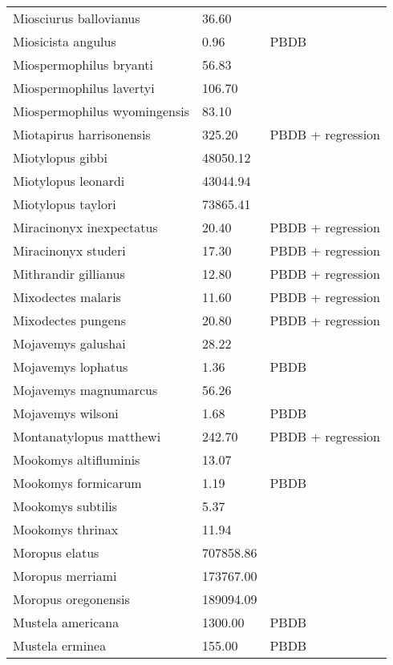 \begin{longtable}{p{} p{} p{}}
    Miosciurus ballovianus & 36.60 & \cite{Tomiya2013} \\ 
    Miosicista angulus & 0.96 & PBDB \\ 
    Miospermophilus bryanti & 56.83 & \cite{Tomiya2013} \\ 
    Miospermophilus lavertyi & 106.70 & \cite{Tomiya2013} \\ 
    Miospermophilus wyomingensis & 83.10 & \cite{Tomiya2013} \\ 
    Miotapirus harrisonensis & 325.20 & PBDB + regression \\ 
    Miotylopus gibbi & 48050.12 & \cite{Tomiya2013} \\ 
    Miotylopus leonardi & 43044.94 & \cite{Tomiya2013} \\ 
    Miotylopus taylori & 73865.41 & \cite{Tomiya2013} \\ 
    Miracinonyx inexpectatus & 20.40 & PBDB + regression \\ 
    Miracinonyx studeri & 17.30 & PBDB + regression \\ 
    Mithrandir gillianus & 12.80 & PBDB + regression \\ 
    Mixodectes malaris & 11.60 & PBDB + regression \\ 
    Mixodectes pungens & 20.80 & PBDB + regression \\ 
    Mojavemys galushai & 28.22 & \cite{Tomiya2013} \\ 
    Mojavemys lophatus & 1.36 & PBDB \\ 
    Mojavemys magnumarcus & 56.26 & \cite{Tomiya2013} \\ 
    Mojavemys wilsoni & 1.68 & PBDB \\ 
    Montanatylopus matthewi & 242.70 & PBDB + regression \\ 
    Mookomys altifluminis & 13.07 & \cite{Tomiya2013} \\ 
    Mookomys formicarum & 1.19 & PBDB \\ 
    Mookomys subtilis & 5.37 & \cite{Tomiya2013} \\ 
    Mookomys thrinax & 11.94 & \cite{Tomiya2013} \\ 
    Moropus elatus & 707858.86 & \cite{Tomiya2013} \\ 
    Moropus merriami & 173767.00 & \cite{McKenna2011} \\ 
    Moropus oregonensis & 189094.09 & \cite{Tomiya2013} \\ 
    Mustela americana & 1300.00 & PBDB \\ 
    Mustela erminea & 155.00 & PBDB \\ 

\end{longtable}
